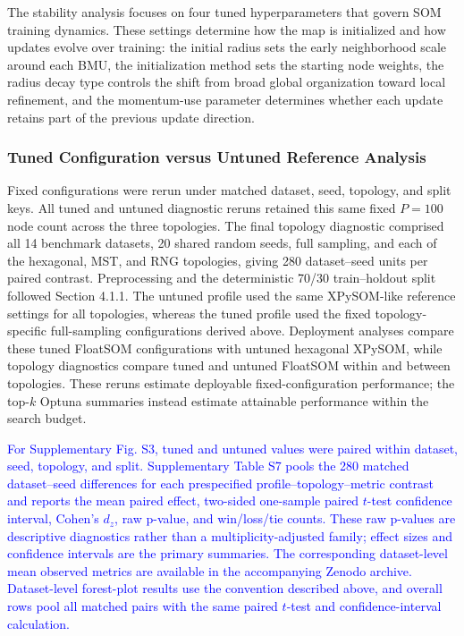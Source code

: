 \documentclass[10pt]{article} %
\newcommand{\TrackedChange}[1]{\textcolor{blue}{#1}}
\begin{document}
The stability analysis focuses on four tuned hyperparameters that govern SOM training dynamics. These settings determine how the map is initialized and how updates evolve over training: the initial radius sets the early neighborhood scale around each BMU, the initialization method sets the starting node weights, the radius decay type controls the shift from broad global organization toward local refinement, and the momentum-use parameter determines whether each update retains part of the previous update direction.

\subsubsection{Tuned Configuration versus Untuned Reference Analysis}

Fixed configurations were rerun under matched dataset, seed, topology, and split keys. All tuned and untuned diagnostic reruns retained this same fixed $P=100$ node count across the three topologies. The final topology diagnostic comprised all 14 benchmark datasets, 20 shared random seeds, full sampling, and each of the hexagonal, MST, and RNG topologies, giving 280 dataset--seed units per paired contrast. Preprocessing and the deterministic 70/30 train--holdout split followed Section 4.1.1. The untuned profile used the same XPySOM-like reference settings for all topologies, whereas the tuned profile used the fixed topology-specific full-sampling configurations derived above. Deployment analyses compare these tuned FloatSOM configurations with untuned hexagonal XPySOM, while topology diagnostics compare tuned and untuned FloatSOM within and between topologies. These reruns estimate deployable fixed-configuration performance; the top-$k$ Optuna summaries instead estimate attainable performance within the search budget.

\TrackedChange{For Supplementary Fig. S3, tuned and untuned values were paired within dataset, seed, topology, and split. Supplementary Table S7 pools the 280 matched dataset--seed differences for each prespecified profile--topology--metric contrast and reports the mean paired effect, two-sided one-sample paired $t$-test confidence interval, Cohen's $d_z$, raw p-value, and win/loss/tie counts. These raw p-values are descriptive diagnostics rather than a multiplicity-adjusted family; effect sizes and confidence intervals are the primary summaries. The corresponding dataset-level mean observed metrics are available in the accompanying Zenodo archive. Dataset-level forest-plot results use the convention described above, and overall rows pool all matched pairs with the same paired $t$-test and confidence-interval calculation.}
\end{document}
